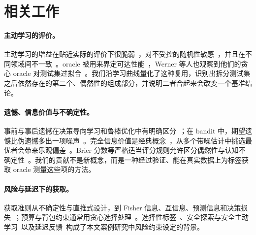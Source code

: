\documentclass[runningheads]{llncs}
\begin{document}
\section{相关工作}
\label{sec:related}
\paragraph{主动学习的评价。}主动学习的增益在贴近实际的评价下很脆弱~\cite{luth2023navigating}，对不受控的随机性敏感~\cite{ji2023randomness}，并且在不同领域间不一致~\cite{werner2023comparable,werner2024cdalbench}。oracle 被用来界定可达性能~\cite{werner2024cdalbench,huseljic2026boss}，Werner 等人也观察到他们的贪心 oracle 对测试集过拟合~\cite{werner2023comparable}。我们沿学习曲线量化了这种复用，识别出拆分测试集之后依然存在的第二个、偶然性的组成部分，并说明二者合起来会改变一个基准结论。

\paragraph{遗憾、信息价值与不确定性。}事前与事后遗憾在决策导向学习和鲁棒优化中有明确区分~\cite{schutte2023robust}；在 bandit 中，期望遗憾比伪遗憾多出一项噪声~\cite{bubeck2012regret,audibert2010regret}。完全信息价值是经典概念~\cite{howard1966information,raiffa1961applied}，从多个带噪估计中挑选最优者会带来乐观偏差~\cite{smith2006optimizer,cawley2010overfitting}。Brier 分数等严格适当评分规则允许区分偶然性与认知不确定性~\cite{hofman2024quantifying}。我们的贡献不是新概念，而是一种经过验证、能在真实数据上为标签获取 oracle 测量这些项的方法。

\paragraph{风险与延迟下的获取。}获取准则从不确定性与直推式设计，到 Fisher 信息、互信息、预测信息和决策损失~\cite{cohn1996active,settles2009active,lewis1994sequential,yu2006transductive,ash2021fishing,kirsch2019batchbald,bickfordsmith2023prediction,huang2026loss,chaloner1995bayesian}；预算与背包约束通常用贪心选择处理~\cite{krause2005near,sviridenko2004note,tomanek2010cost}。选择性标签~\cite{lakkaraju2017selective,wei2021selective,kilbertus2020fair,keswani2024partial,crook2004reject}、安全探索与安全主动学习~\cite{sui2015safe,schreiter2015safe,wu2016conservative}以及延迟反馈~\cite{joulani2013delayed,chapelle2014delayed,pham2022latency}构成了本文案例研究中风险约束设定的背景。

\end{document}
